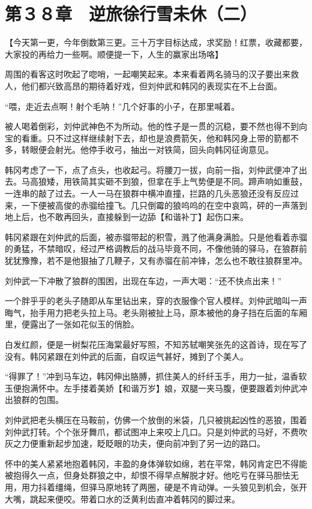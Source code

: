 \section{第３８章　逆旅徐行雪未休（二）}

【今天第一更，今年倒数第三更。三十万字目标达成，求奖励！红票，收藏都要，大家投的再给力一些啊。顺便提一下，人生的赢家出场咯】

周围的看客这时吹起了唿哨，一起嘲笑起来。本来看着两名骑马的汉子要出来救人，他们都兴致高昂的期待着好戏，但刘仲武和韩冈的表现实在不上台面。

“喂，走近去点啊！射个毛呐！”几个好事的小子，在那里喊着。

被人喝着倒彩，刘仲武神色不为所动。他的性子是一贯的沉稳，要不然也得不到向宝的看重。只不过这样继续射下去，却也是浪费箭矢，他和韩冈身上带的箭都不多，转眼便会射光。他停手收弓，抽出一对铁简，回头向韩冈征询意见。

韩冈考虑了一下，点了点头，也收起弓。将腰刀一拔，向前一指，刘仲武便冲了出去。马高狼矮，用铁简其实砸不到狼，但拿在手上气势便是不同。蹄声响如重鼓，一连串的敲了过去。一人一马在狼群中横冲直撞，拦路的几头恶狼还没有反应过来，一下便被高俊的赤骝给撞飞。几只倒霉的狼呜呜的在空中哀鸣，砰的一声落到地上后，也不敢再回头，直接躲到一边舔【和谐补丁】起伤口来。

韩冈紧跟在刘仲武的后面，被赤骝带起的积雪，溅了他满身满脸。只是他看着赤骝的勇猛，不禁暗叹，经过严格调教后的战马毕竟不同，不像他骑的驿马，在狼群前犹犹豫豫，若不是他狠抽了几鞭子，又有赤骝在前冲锋，怎么也不敢往狼群里冲。

刘仲武一下冲散了狼群的围困，出现在车边，一声大喝：“还不快点出来！”

一个胖乎乎的老头子随即从车里钻出来，穿的衣服像个官人模样。刘仲武暗叫一声晦气，抬手用力把老头拉上马。老头刚被扯上马，原本被他的身子挡在后面的车厢里，便露出了一张如花似玉的俏脸。

白发红颜，便是一树梨花压海棠最好写照，不知苏轼嘲笑张先的这首诗，现在写了没有。韩冈紧跟在刘仲武的后面，自叹运气甚好，摊到了个美人。

“得罪了！”冲到马车边，韩冈伸出胳膊，抓住美人的纤纤玉手，用力一扯，温香软玉便抱满怀中。左手搂着美娇【和谐万岁】娘，双腿一夹马腹，便要跟着刘仲武冲出狼群的包围。

刘仲武把老头横压在马鞍前，仿佛一个放倒的米袋，几只被挑起凶性的恶狼，围着刘仲武打转。个个张牙舞爪，都试图冲上来咬上几口。只是刘仲武的马好，不费吹灰之力便重新起步加速，眨眨眼的功夫，便向前冲到了另一边的路口。

怀中的美人紧紧地抱着韩冈，丰盈的身体弹软如绵，若在平常，韩冈肯定巴不得能被抱得久一点，但身处群狼之中，却恨不得早点解脱才好。他吃亏在驿马胆怯无用，用力抖着缰绳，但驿马原地转了两圈，硬是不肯动弹。一头狼见到机会，张开大嘴，跳起来便咬。带着口水的泛黄利齿直冲着韩冈的脚过来。

